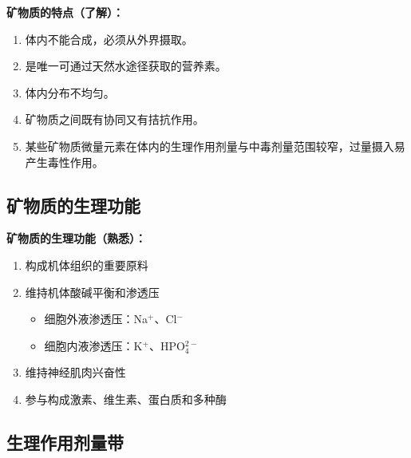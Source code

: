 \begin{tipbox}
\textbf{矿物质的特点（了解）：}
\begin{enumerate}[leftmargin=*]
    \item 体内不能合成，必须从外界摄取。
    \item 是唯一可通过天然水途径获取的营养素。
    \item 体内分布不均匀。
    \item 矿物质之间既有协同又有拮抗作用。
    \item 某些矿物质微量元素在体内的生理作用剂量与中毒剂量范围较窄，过量摄入易产生毒性作用。
\end{enumerate}
\end{tipbox}

\subsection{矿物质的生理功能}

\begin{tipbox}
\textbf{矿物质的生理功能（熟悉）：}
\begin{enumerate}[leftmargin=*]
    \item 构成机体组织的重要原料
    \item 维持机体酸碱平衡和渗透压
    \begin{itemize}[leftmargin=*]
        \item 细胞外液渗透压：Na$^+$、Cl$^-$
        \item 细胞内液渗透压：K$^+$、HPO$_4^{2-}$
    \end{itemize}
    \item 维持神经肌肉兴奋性
    \item 参与构成激素、维生素、蛋白质和多种酶
\end{enumerate}
\end{tipbox}

\subsection{生理作用剂量带}


